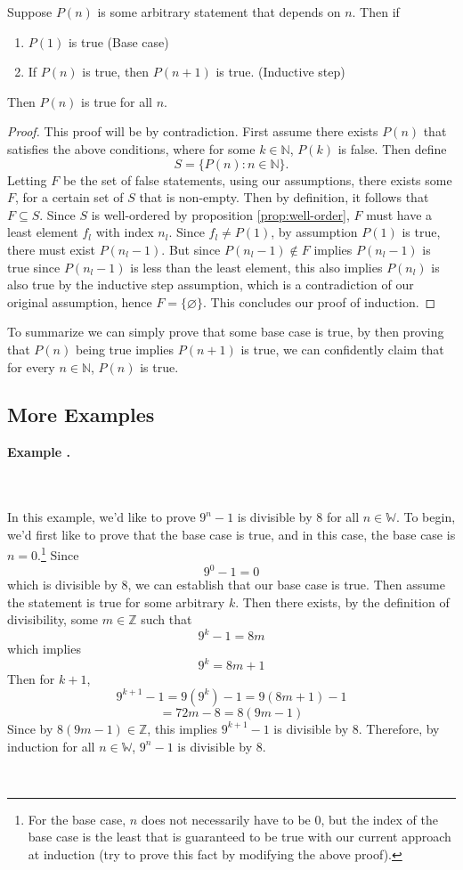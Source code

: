 \documentclass[11pt]{article}
\numberwithin{lemma}{section}
\numberwithin{equation}{section}
\numberwithin{define}{section}
\numberwithin{prop}{section}
\numberwithin{figure}{section}
\numberwithin{theorem}{section}
\newcounter{ex}[section]
\newenvironment{ex}[0]{

	\refstepcounter{ex}
	\begin{large}
    \textbf{Example \theex .}
    \end{large}\\\\
    }
    {
    \\
    }
\numberwithin{ex}{section}
\def\nat{\mathbb{N}}
\def\integ{\mathbb{Z}}
\begin{document}
\begin{theorem}[Induction]
	Suppose $P(n)$ is some arbitrary statement that depends on $n$. Then if
	\begin{enumerate}
		\item $P(1)$ is true (Base case)
		\item If $P(n)$ is true, then $P(n+1)$ is true. (Inductive step)
	\end{enumerate}
	Then $P(n)$ is true for all $n$.
\end{theorem}
\begin{proof}
	This proof will be by contradiction. First assume there exists $P(n)$ that satisfies the above conditions, where for some $k\in\nat$, $P(k)$ is false. 
	Then define 
	$$S=\{P(n):n\in\nat\}.$$
	Letting $F$ be the set of false statements, using our assumptions, there exists some $F$, for a certain set of $S$ that is non-empty. 
	Then by definition, it follows that $F\subseteq S$. Since $S$ is well-ordered by proposition \eqref{prop:well-order}, $F$ must have a least element $f_l$ with index $n_l$. 
	Since $f_l\neq P(1)$, by assumption $P(1)$ is true, there must exist $P(n_l-1)$. 
	But since $P(n_l-1)\notin F$ implies $P(n_l-1)$ is true since $P(n_l-1)$ is less than the least element, this also implies $P(n_l)$ is also true by the inductive step assumption, which is a contradiction of our original assumption, hence $F=\{\varnothing\}$. 
	This concludes our proof of induction.
\end{proof}

To summarize we can simply prove that some base case is true, by then proving that $P(n)$ being true implies $P(n+1)$ is true, we can confidently claim that for every $n\in\nat$, $P(n)$ is true.
\subsection{More Examples}
\begin{ex}
	In this example, we'd like to prove $9^n-1$ is divisible by $8$ for all $n\in\mathbb{W}$. 
	To begin, we'd first like to prove that the base case is true, and in this case, the base case is $n=0$.\footnote{For the base case, $n$ does not necessarily have to be 0, but the index of the base case is the least that is guaranteed to be true with our current approach at induction (try to prove this fact by modifying the above proof).} Since
	$$9^0-1=0$$
	which is divisible by 8, we can establish that our base case is true. Then assume the statement is true for some arbitrary $k$. Then there exists, by the definition of divisibility, some $m\in\integ$ such that
	$$9^k-1=8m$$
	which implies
	$$9^k=8m+1$$
	Then for $k+1$,
	$$9^{k+1}-1=9(9^k)-1=9(8m+1)-1$$
	$$=72m-8=8(9m-1)$$
	Since by $8(9m-1)\in\integ$, this implies $9^{k+1}-1$ is divisible by 8. Therefore, by induction for all $n\in\mathbb{W}$, $9^n-1$ is divisible by 8.
\end{ex}
\end{document}
